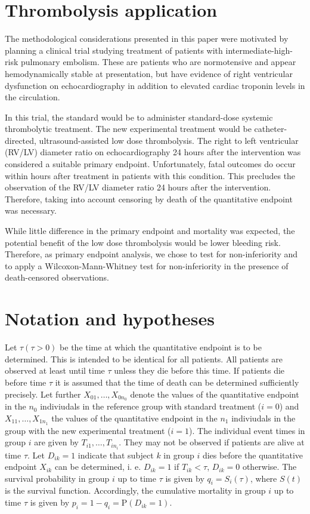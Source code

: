 \documentclass[bimj,fleqn]{w-art}\usepackage[]{graphicx}\usepackage[]{color}
\theoremstyle{plain}
\theoremstyle{definition}
\begin{document}
\section{Thrombolysis application}
\label{sec:ThrombolysisApplication}
The methodological considerations presented in this paper were motivated by
planning a clinical trial studying treatment of patients with
intermediate-high-risk pulmonary embolism. These are patients who are
normotensive and appear hemodynamically stable at presentation, but have
evidence of right ventricular dysfunction on echocardiography in addition to
elevated cardiac troponin levels in the circulation.

In this trial, the standard would be to administer standard-dose systemic
thrombolytic treatment. The new experimental treatment would be catheter-directed,
ultrasound-assisted low dose thrombolysis. The right to left ventricular (RV/LV)
diameter ratio on echocardiography 24 hours after the intervention was
considered a suitable primary endpoint. Unfortunately, fatal
outcomes do occur within hours after treatment in patients with this condition.
This precludes the observation of the RV/LV diameter ratio 24 hours after the
intervention. Therefore, taking into account censoring by death of the
quantitative endpoint was necessary.

While little difference in the primary endpoint and mortality was expected,
the potential benefit of the low dose thrombolysis would be lower bleeding
risk. Therefore, as primary endpoint analysis, we chose to test for
non-inferiority and to apply a Wilcoxon-Mann-Whitney test for non-inferiority
in the presence of death-censored observations.

\section{Notation and hypotheses}
\label{sec:Notation}
Let  $\tau (\tau > 0)$ be the time at which the quantitative endpoint is to
be determined. This is intended to be identical for all patients. All patients
are observed at least until time $\tau$ unless they die before this time. If patients
die before time $\tau$ it is assumed that the time of death can be determined
sufficiently precisely. Let further $X_{01}, \ldots, X_{0n_0}$ denote the values
of the quantitative endpoint in the $n_0$ indiviudals in the reference group
with standard treatment ($i=0$) and $X_{11}, \ldots, X_{1n_1}$ the values of the
quantitative endpoint in the $n_1$ indiviudals in the group with the new
experimental treatment ($i=1$). The individual event times in group $i$ are
given by $T_{i1}, \ldots, T_{in_i}$. They may not be observed if patients are
alive at time $\tau$. Let $D_{ik} = 1$ indicate that subject $k$ in group $i$
dies before the quantitative endpoint $X_{ik}$ can be determined, i. e.
$D_{ik} = 1$ if $T_{ik} < \tau $, $D_{ik} = 0$ otherwise. The survival
probability in group $i$ up to time $\tau$ is given by $q_i = S_i(\tau)$, where
$S(t)$ is the survival function. Accordingly, the cumulative mortality in group
$i$ up to time $\tau$ is given by $p_i = 1 - q_i = \text{P}(D_{ik} = 1)$.
\end{document}
